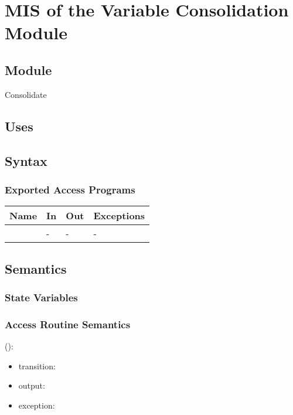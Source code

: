 \documentclass[12pt, titlepage]{article}
\begin{document}
\newpage

\section{MIS of the Variable Consolidation Module} 
\label{Module_variableconsolidation}

\subsection{Module}

Consolidate

\subsection{Uses}


\subsection{Syntax}

\subsubsection{Exported Access Programs}

\begin{center}
	\begin{tabular}{p{3cm} p{4cm} p{4cm} p{2cm}}
		\hline
		\textbf{Name} & \textbf{In} & \textbf{Out} & \textbf{Exceptions} \\
		\hline
		\wss{accessProg} & - & - & - \\
		\hline
	\end{tabular}
\end{center}

\subsection{Semantics}

\subsubsection{State Variables}


\subsubsection{Access Routine Semantics}

\noindent {}():
\begin{itemize}
	\item transition:  
	\item output:  
	\item exception:  
\end{itemize}
\end{document}
